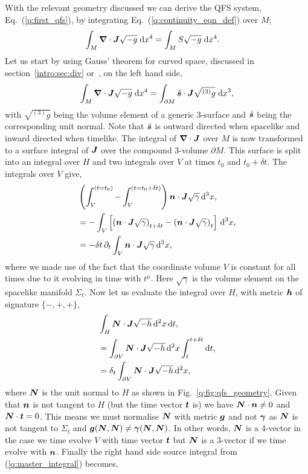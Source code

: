With the relevant geometry discussed we can derive the QFS system, Eq.~(\ref{q:first_qfs}), by integrating Eq.~(\ref{q:continuity_eqn_def}) over $M$;
\begin{align} \label{q:master_integral}
\int_{M } \boldsymbol{\nabla}\cdot \boldsymbol{J} \sqrt{-g} \;\dd x^4 &= \int_{M } S \sqrt{-g} \;\dd x^4.
\end{align}
Let us start by using Gauss' theorem for curved space, discussed in section~\ref{intro:sec:div} or~\cite{baumgarte_shapiro_2010}, on the left hand side,
\begin{align} \label{q:master_gauss}
\int_{M } \boldsymbol{\nabla}\cdot \boldsymbol{J} \sqrt{-g}\;\dd x^4  = \int_{\partial M } \hat{\boldsymbol{s}} \cdot \boldsymbol{J} \sqrt{{}^{(3)}{g}} \;\dd x^3 ,
\end{align}
with $\sqrt{{}^{(3)}g}$ being the volume element of a generic 3-surface and $\hat{\boldsymbol{s}}$ being the corresponding unit normal. Note that $\hat{\boldsymbol s}$ is outward directed when spacelike and inward directed when timelike. The integral of  $\boldsymbol{\nabla} \cdot \boldsymbol{J}$ over $M$ is now transformed to a surface integral of $\boldsymbol{J}$ over the compound 3-volume $\partial M$. This surface is split into an integral over $H$ and two integrals over $V$ at times $t_0$ and $t_0 + \delta t$. The integrals over $V$ give,
\begin{align}
&\left(\int^{(t=t_0)}_{V} - \int^{(t=t_0+\delta t)}_{V} \right)\boldsymbol{n} \cdot \boldsymbol{J} \sqrt{\gamma} \,\dd^3 x ,\nonumber \\
&=-\int_{V}\left[\left(\boldsymbol{n} \cdot \boldsymbol{J} \sqrt{\gamma}\right)_{t+\delta t} - \left(\boldsymbol{n} \cdot \boldsymbol{J} \sqrt{\gamma}\right)_{t}\right] \,\dd^3 x, \\
\label{q:q_int}&=-\delta t\,\partial_t \int_{V} \boldsymbol{n} \cdot \boldsymbol{J} \sqrt{\gamma}\,\dd^3 x ,
\end{align}
where we made use of the fact that the coordinate volume $V$ is constant for all times due to it evolving in time with $t^\mu$. Here $\sqrt{\gamma}$ is the volume element on the spacelike manifold $\Sigma_t$. Now let us evaluate the integral over $H$, with metric $\boldsymbol{h}$ of signature $\{-,+,+\}$,
\begin{align}
&\int_{H} \boldsymbol{N} \cdot \boldsymbol{J} \sqrt{-h} \,\dd^2 x\,\dd t, \nonumber \\
&=\int_{\partial V}  \boldsymbol{N} \cdot \boldsymbol{J} \sqrt{-h} \,\dd^2 x\int_t^{t+\delta t}\dd t, \\
\label{q:f_int}&=\delta_t \int_{\partial V} \boldsymbol{N} \cdot \boldsymbol{J} \sqrt{-h} \,\dd^2 x,
\end{align}
where $\boldsymbol{N}$ is the unit normal to $H$ as shown in Fig.~\ref{q:fig:qfs_geometry}. Given that $\boldsymbol{n}$ is not tangent to $H$ (but the time vector $\boldsymbol{t}$ is) we have $\boldsymbol{N} \cdot \boldsymbol{n} \neq 0$ and $\boldsymbol{N} \cdot \boldsymbol{t} =0$. This means we must normalise $\boldsymbol{N}$ with metric $\boldsymbol{g}$ and not $\boldsymbol{\gamma}$ as $\boldsymbol{N}$ is not tangent to $\Sigma_t$ and $\boldsymbol{g}(\boldsymbol{N},\boldsymbol{N})\neq \boldsymbol{\gamma}(\boldsymbol{N},\boldsymbol{N})$. In other words, $\boldsymbol{N}$ is a 4-vector in the case we time evolve $V$ with time vector $\boldsymbol{t}$ but $\boldsymbol{N}$ is a 3-vector if we time evolve with $\boldsymbol{n}$. Finally the right hand side source integral from (\ref{q:master_integral}) becomes,
